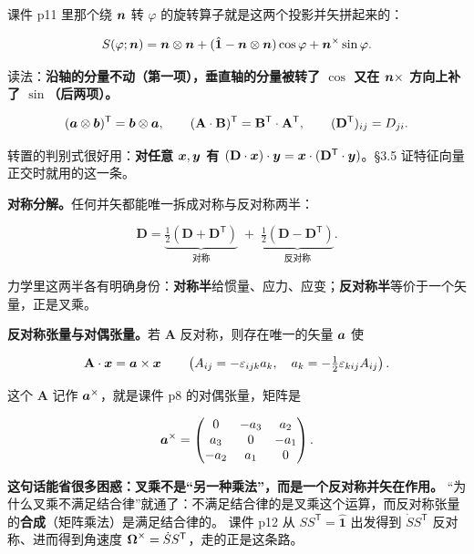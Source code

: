 \documentclass[11pt]{ctexart}
\newcommand{\ten}[1]{\mathbf{#1}}
\newcommand{\unitd}{\hat{\ten{1}}}
\let\origsubhdr\subhdr
\renewcommand{\subhdr}[1]{\par\needspace{3\baselineskip}\origsubhdr{#1}}
\begin{document}
课件 p11 里那个绕 $\boldsymbol{n}$ 转 $\varphi$ 的旋转算子就是这两个投影并矢拼起来的：

\[
S(\varphi;\vect n)=\vect n\otimes\vect n+(\unitd-\vect n\otimes\vect n)\cos\varphi+\vect n^{\times}\sin\varphi .
\]

读法：\textbf{沿轴的分量不动（第一项），垂直轴的分量被转了 $\cos$ 又在 $\boldsymbol{n}\times$ 方向上补了 $\sin$（后两项）。}


\[
(\vect a\otimes\vect b)^{\mathsf T}=\vect b\otimes\vect a,
\qquad
(\ten A\cdot\ten B)^{\mathsf T}=\ten B^{\mathsf T}\cdot\ten A^{\mathsf T},
\qquad
(\ten D^{\mathsf T})_{ij}=D_{ji}.
\]

转置的判别式很好用：\textbf{对任意 $\boldsymbol{x},\boldsymbol{y}$ 有 $(\ten D\cdot\vect x)\cdot\vect y=\vect x\cdot(\ten D^{\mathsf T}\cdot\vect y)$}。§3.5 证特征向量正交时就用的这一条。

\textbf{对称分解。}任何并矢都能唯一拆成对称与反对称两半：

\[
\ten D=\underbrace{\tfrac12(\ten D+\ten D^{\mathsf T})}_{\text{对称}}\;+\;
\underbrace{\tfrac12(\ten D-\ten D^{\mathsf T})}_{\text{反对称}} .
\]

力学里这两半各有明确身份：\textbf{对称半}给惯量、应力、应变；\textbf{反对称半}等价于一个矢量，正是叉乘。

\textbf{反对称张量与对偶张量。}若 $\ten A$ 反对称，则存在唯一的矢量 $\boldsymbol{a}$ 使

\[
\ten A\cdot\vect x=\vect a\times\vect x
\qquad
\left(A_{ij}=-\varepsilon_{ijk}a_k,\quad a_k=-\tfrac12\varepsilon_{kij}A_{ij}\right).
\]

这个 $\ten A$ 记作 $\boldsymbol{a}^{\times}$，就是课件 p8 的对偶张量，矩阵是

\[
\boldsymbol{a}^{\times}=
\begin{pmatrix}
0&-a_3&a_2\\
a_3&0&-a_1\\
-a_2&a_1&0
\end{pmatrix}.
\]

\textbf{这句话能省很多困惑：叉乘不是“另一种乘法”，而是一个反对称并矢在作用。}
“为什么叉乘不满足结合律”就通了：不满足结合律的是叉乘这个运算，而反对称张量的\textbf{合成}（矩阵乘法）是满足结合律的。
课件 p12 从 $S S^{\mathsf T}=\unitd$ 出发得到 $\dot S S^{\mathsf T}$ 反对称、进而得到角速度 $\boldsymbol{\Omega}^{\times}=\dot S S^{\mathsf T}$，走的正是这条路。

\end{document}

